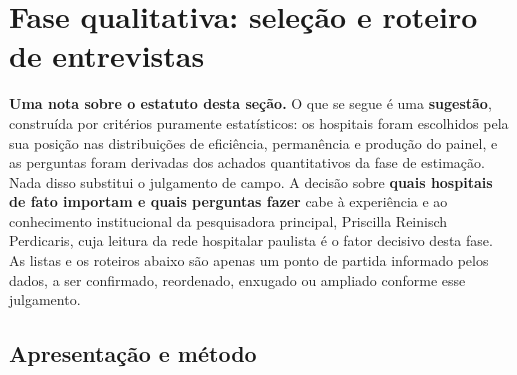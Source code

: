 \section{Fase qualitativa: seleção e roteiro de entrevistas}
\label{sec:qualitativa}

\newcommand{\parte}[1]{\subsection{#1}}
\newcommand{\bloco}[1]{\subsubsection{#1}}
\newcommand{\achado}[1]{%
  \par\smallskip
  \noindent\begingroup\small\itshape
  \textcolor{black!70}{Achado que a pergunta testa: #1}%
  \endgroup\par\smallskip}

\noindent\textbf{Uma nota sobre o estatuto desta seção.} O que se segue é
uma \textbf{sugestão}, construída por critérios puramente estatísticos:
os hospitais foram escolhidos pela sua posição nas distribuições de
eficiência, permanência e produção do painel, e as perguntas foram
derivadas dos achados quantitativos da fase de estimação. Nada disso
substitui o julgamento de campo. A decisão sobre \textbf{quais hospitais
de fato importam e quais perguntas fazer} cabe à experiência e ao
conhecimento institucional da pesquisadora principal, Priscilla Reinisch
Perdicaris, cuja leitura da rede hospitalar paulista é o fator decisivo
desta fase. As listas e os roteiros abaixo são apenas um ponto de partida
informado pelos dados, a ser confirmado, reordenado, enxugado ou ampliado
conforme esse julgamento.

\parte{Apresentação e método}

